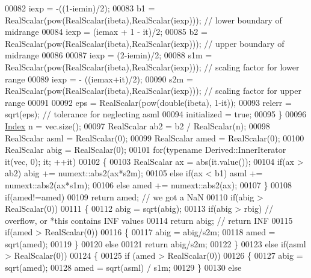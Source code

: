 \begin{DoxyCode}
00082     iexp  = -((1-iemin)/2);
00083     b1    = RealScalar(pow(RealScalar(ibeta),RealScalar(iexp)));    \textcolor{comment}{// lower boundary of midrange}
00084     iexp  = (iemax + 1 - it)/2;
00085     b2    = RealScalar(pow(RealScalar(ibeta),RealScalar(iexp)));    \textcolor{comment}{// upper boundary of midrange}
00086 
00087     iexp  = (2-iemin)/2;
00088     s1m   = RealScalar(pow(RealScalar(ibeta),RealScalar(iexp)));    \textcolor{comment}{// scaling factor for lower range}
00089     iexp  = - ((iemax+it)/2);
00090     s2m   = RealScalar(pow(RealScalar(ibeta),RealScalar(iexp)));    \textcolor{comment}{// scaling factor for upper range}
00091 
00092     eps     = RealScalar(pow(\textcolor{keywordtype}{double}(ibeta), 1-it));
00093     relerr  = sqrt(eps);                                            \textcolor{comment}{// tolerance for neglecting asml}
00094     initialized = \textcolor{keyword}{true};
00095   \}
00096   \hyperlink{namespace_eigen_a62e77e0933482dafde8fe197d9a2cfde}{Index} n = vec.size();
00097   RealScalar ab2 = b2 / RealScalar(n);
00098   RealScalar asml = RealScalar(0);
00099   RealScalar amed = RealScalar(0);
00100   RealScalar abig = RealScalar(0);
00101   \textcolor{keywordflow}{for}(\textcolor{keyword}{typename} Derived::InnerIterator it(vec, 0); it; ++it)
00102   \{
00103     RealScalar ax = abs(it.value());
00104     \textcolor{keywordflow}{if}(ax > ab2)     abig += numext::abs2(ax*s2m);
00105     \textcolor{keywordflow}{else} \textcolor{keywordflow}{if}(ax < b1) asml += numext::abs2(ax*s1m);
00106     \textcolor{keywordflow}{else}             amed += numext::abs2(ax);
00107   \}
00108   \textcolor{keywordflow}{if}(amed!=amed)
00109     \textcolor{keywordflow}{return} amed;  \textcolor{comment}{// we got a NaN}
00110   \textcolor{keywordflow}{if}(abig > RealScalar(0))
00111   \{
00112     abig = sqrt(abig);
00113     \textcolor{keywordflow}{if}(abig > rbig) \textcolor{comment}{// overflow, or *this contains INF values}
00114       \textcolor{keywordflow}{return} abig;  \textcolor{comment}{// return INF}
00115     \textcolor{keywordflow}{if}(amed > RealScalar(0))
00116     \{
00117       abig = abig/s2m;
00118       amed = sqrt(amed);
00119     \}
00120     \textcolor{keywordflow}{else}
00121       \textcolor{keywordflow}{return} abig/s2m;
00122   \}
00123   \textcolor{keywordflow}{else} \textcolor{keywordflow}{if}(asml > RealScalar(0))
00124   \{
00125     \textcolor{keywordflow}{if} (amed > RealScalar(0))
00126     \{
00127       abig = sqrt(amed);
00128       amed = sqrt(asml) / s1m;
00129     \}
00130     \textcolor{keywordflow}{else}

\end{DoxyCode}
